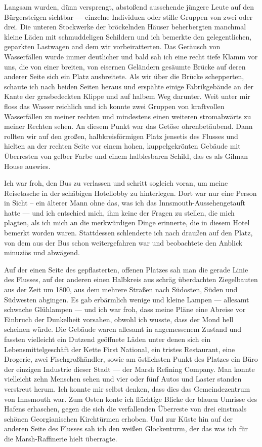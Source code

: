 Langsam wurden, dünn versprengt, abstoßend aussehende jüngere Leute auf den Bürgersteigen sichtbar --- einzelne Individuen oder stille Gruppen von zwei oder drei. Die unteren Stockwerke der bröckelnden Häuser beherbergten manchmal kleine Läden mit schmuddeligen Schildern und ich bemerkte den gelegentlichen, geparkten Lastwagen and dem wir vorbeiratterten. Das Geräusch von Wasserfällen wurde immer deutlicher  und bald sah ich eine recht tiefe Klamm vor uns, die von einer breiten, von eisernen Geländern gesäumte Brücke auf deren anderer Seite sich ein Platz ausbreitete. Als wir über die Brücke schepperten, schaute ich nach beiden Seiten heraus und erspähte einige Fabrikgebäude an der Kante der grasbedeckten Klippe und auf halbem Weg darunter. Weit unter mir floss das Wasser reichlich und ich konnte zwei Gruppen von kraftvollen Wasserfällen zu meiner rechten und mindestens einen weiteren stromabwärts zu meiner Rechten sehen. An diesem Punkt war das Getöse ohrenbetäubend. Dann rollten wir auf den großen, halbkreisförmigen Platz jensetis des Flusses und hielten an der rechten Seite vor einem hohen, kuppelgekrönten Gebäude mit Überresten von gelber Farbe und einem halblesbaren Schild, das es als Gilman House auswies.

Ich war froh, den Bus zu verlassen und schritt sogleich voran, um meine Reisetasche in der schäbigen Hotellobby zu hinterlegen. Dort war nur eine Person in Sicht -- ein älterer Mann ohne das, was ich das \glqq Innsmouth-Aussehen\grqq getauft hatte --- und ich entschied mich, ihm keine der Fragen zu stellen, die mich plagten, als ich mich an die merkwürdigen Dinge erinnerte, die in diesem Hotel bemerkt worden waren. Stattdessen schlenderte ich nach draußen auf den Platz, von dem aus der Bus schon weitergefahren war und beobachtete den Anblick minuziös und abwägend.

Auf der einen Seite des gepflasterten, offenen Platzes sah man die gerade Linie des Flusses, auf der anderen einen Halbkreis aus schräg überdachten Ziegelbauten aus der Zeit um 1800, aus dem mehrere Straßen nach Südosten, Süden und Südwesten abgingen. Es gab erbärmlich wenige und kleine Lampen --- allesamt schwache Glühlampen --- und ich war froh, dass meine Pläne eine Abreise vor Einbruch der Dunkelheit vorsahen, obwohl ich wusste, dass der Mond hell scheinen würde. Die Gebäude waren allesamt in angemessenem Zustand und fassten vielleicht ein Dutzend geöffnete Läden unter denen sich ein Lebensmittelgeschäft der Kette First National, ein tristes Restaurant, eine Drogerie, zwei Fischgroßhändler, sowie am östlichsten Punkt des Platzes ein Büro der einzigen Industrie dieser Stadt --- der Marsh Refining Company. Man konnte vielleicht zehn Menschen sehen und vier oder fünf Autos und Laster standen verstreut herum. Ich konnte mir selbst denken, dass dies das Gemeindezentrum von Innsmouth war. Zum Osten konte ich flüchtige Blicke der blauen Umrisse des Hafens erhaschen, gegen die sich die verfallenden Überreste von drei einstmals schönen Georgianischen Kirchtürmen erhoben. Und zur Küste hin auf der anderen Seite des Flusses sah ich den weißen Glockenturm, der das was ich für die Marsh-Raffinerie hielt überragte.

